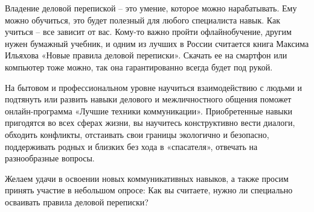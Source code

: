 Владение деловой перепиской – это умение, которое можно нарабатывать. Ему можно обучиться, это будет полезный для любого специалиста навык. Как учиться – все зависит от вас. Кому-то важно пройти офлайнобучение, другим нужен бумажный учебник, и одним из лучших в России считается книга Максима Ильяхова «Новые правила деловой переписки».  Скачать ее на смартфон или компьютер тоже можно, так она гарантированно всегда будет под рукой.

На бытовом и профессиональном уровне научиться взаимодействию с людьми и подтянуть или развить навыки делового и межличностного общения поможет онлайн-программа «Лучшие техники коммуникации». Приобретенные навыки пригодятся во всех сферах жизни, вы научитесь конструктивно вести диалоги, обходить конфликты, отстаивать свои границы экологично и безопасно, поддерживать родных и близких без хода в «спасателя», отвечать на разнообразные вопросы.

Желаем удачи в освоении новых коммуникативных навыков, а также просим принять участие в небольшом опросе: Как вы считаете, нужно ли специально осваивать правила деловой переписки?